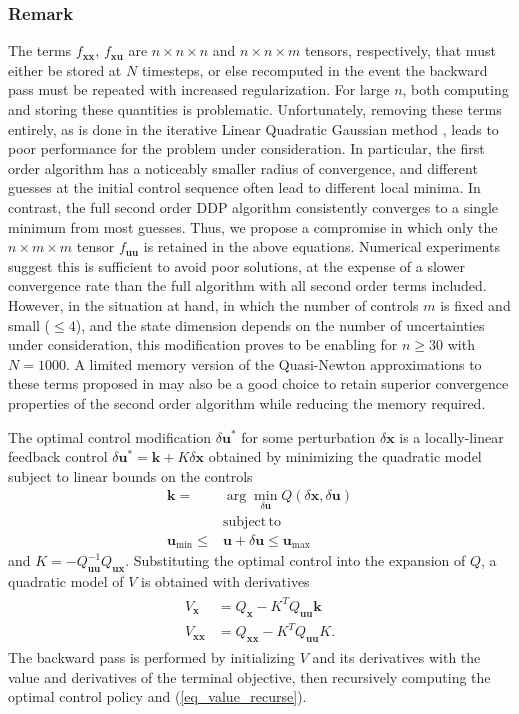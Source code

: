 \documentclass[letterpaper, paper,11pt]{AAS}
\newcommand{\state}{\ensuremath{\mathbf{x}}}
\newcommand{\control}{\ensuremath{\mathbf{u}}}
\begin{document}
\subsubsection{Remark} The terms $f_{\state\state},\, f_{\state\control}$ are $n\times n\times n$ and $n\times n\times m$ tensors, respectively, that must either be stored at $N$ timesteps, or else recomputed in the event the backward pass must be repeated with increased regularization. For large $n$, both computing and storing these quantities is problematic. Unfortunately, removing these terms entirely, as is done in the iterative Linear Quadratic Gaussian method \cite{iLQG}, leads to poor performance for the problem under consideration. In particular, the first order algorithm has a noticeably smaller radius of convergence, and different guesses at the initial control sequence often lead to different local minima. In contrast, the full second order DDP algorithm consistently converges to a single minimum from most guesses. Thus, we propose a compromise in which only the $n\times m \times m$ tensor $f_{\control\control}$ is retained in the above equations. Numerical experiments suggest this is sufficient to avoid poor solutions, at the expense of a slower convergence rate than the full algorithm with all second order terms included. However, in the situation at hand, in which the number of controls $m$ is fixed and small ($ \le4 $), and the state dimension depends on the number of uncertainties under consideration, this modification proves to be enabling for $n\ge 30$ with $N=1000$. A limited memory version of the Quasi-Newton approximations to these terms proposed in \cite{QNDDP} may also be a good choice to retain superior convergence properties of the second order algorithm while reducing the memory required. 

The optimal control modification $\delta\control^*$ for some perturbation $\delta\state$ is a locally-linear feedback control $\delta\control^* = \mathbf{k} + K\delta\state$ obtained by minimizing the quadratic model subject to linear bounds on the controls
\begin{align}
\mathbf{k} = &\arg\min_{\delta\control} Q(\delta\state,\delta\control) \\
&\mathrm{subject\,to\,\;} \nonumber\\
\control_{\min}\le&\control+\delta\control \le\control_{\max}
\end{align}
and $K = -Q_{\control\control}^{-1}Q_{\control\state}$. Substituting the optimal control into the expansion of $Q$, a quadratic model of $V$ is obtained with derivatives
\begin{align}
\begin{split}
\label{eq_value_recurse}
V_\state &= Q_{\state}- K^TQ_{\control\control}\mathbf{k}\\
V_{\state\state} &= Q_{\state\state} - K^TQ_{\control\control}K.
\end{split}
\end{align}
The backward pass is performed by initializing $V$ and its derivatives with the value and derivatives of the terminal objective, then recursively computing the optimal control policy and (\ref{eq_value_recurse}).
\end{document}
